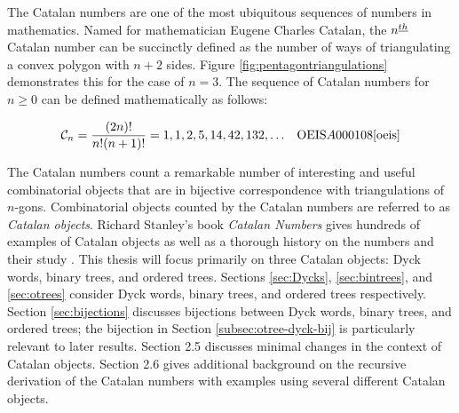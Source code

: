 The Catalan numbers are one of the most ubiquitous sequences of numbers in mathematics.  
Named for mathematician Eugene Charles Catalan, the $n^{\underline{th}}$ Catalan number can be succinctly defined as the number of ways of triangulating a convex polygon with $n+2$ sides.  Figure \ref{fig:pentagontriangulations} demonstrates this for the case of $n=3$. The sequence of Catalan numbers for $n \ge 0$ can be defined mathematically as follows:

\begin{align}
    \mathcal{C}_n &= \frac{(2n)!}{n!(n+1)!} =1, 1, 2, 5, 14, 42, 132, \ldots & \text{OEIS} A000108 \cite{oeis}
\end{align}



The Catalan numbers count a remarkable number of interesting and useful combinatorial objects that are in bijective correspondence with triangulations of $n$-gons. Combinatorial objects counted by the Catalan numbers are referred to as \emph{Catalan objects}.   Richard Stanley's book \emph{Catalan Numbers} gives hundreds of examples of Catalan objects  as well as a thorough history on the numbers and their study \cite{stanley2015Catalan}. This thesis will focus primarily on three Catalan objects: Dyck words, binary trees, and ordered trees. Sections \ref{sec:Dycks}, \ref{sec:bintrees}, and \ref{sec:otrees} consider Dyck words, binary trees, and ordered trees respectively.  Section \ref{sec:bijections} discusses bijections between Dyck words, binary trees, and ordered trees; the bijection in Section \ref{subsec:otree-dyck-bij} is particularly relevant to later results.  Section 2.5 discusses minimal changes in the context of Catalan objects. Section 2.6 gives additional background on the recursive derivation of the Catalan numbers with examples using several different Catalan objects.


